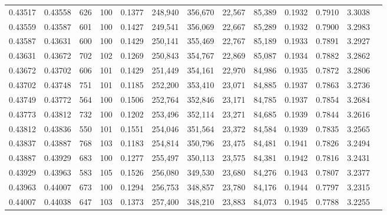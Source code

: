 \begin{tabular}{rrrrrrrrrrrrr}
0.43517 & 0.43558 &   626 & 100 &                                     0.1377 & 248,940 & 356,670 &  22,567 &  85,389 & 0.1932 & 0.7910 & 3.3038 \\
0.43559 & 0.43587 &   601 & 100 &                                     0.1427 & 249,541 & 356,069 &  22,667 &  85,289 & 0.1932 & 0.7900 & 3.2983 \\
0.43587 & 0.43631 &   600 & 100 &                                     0.1429 & 250,141 & 355,469 &  22,767 &  85,189 & 0.1933 & 0.7891 & 3.2927 \\
0.43631 & 0.43672 &   702 & 102 &                                     0.1269 & 250,843 & 354,767 &  22,869 &  85,087 & 0.1934 & 0.7882 & 3.2862 \\
0.43672 & 0.43702 &   606 & 101 &                                     0.1429 & 251,449 & 354,161 &  22,970 &  84,986 & 0.1935 & 0.7872 & 3.2806 \\
0.43702 & 0.43748 &   751 & 101 &                                     0.1185 & 252,200 & 353,410 &  23,071 &  84,885 & 0.1937 & 0.7863 & 3.2736 \\
0.43749 & 0.43772 &   564 & 100 &                                     0.1506 & 252,764 & 352,846 &  23,171 &  84,785 & 0.1937 & 0.7854 & 3.2684 \\
0.43773 & 0.43812 &   732 & 100 &                                     0.1202 & 253,496 & 352,114 &  23,271 &  84,685 & 0.1939 & 0.7844 & 3.2616 \\
0.43812 & 0.43836 &   550 & 101 &                                     0.1551 & 254,046 & 351,564 &  23,372 &  84,584 & 0.1939 & 0.7835 & 3.2565 \\
0.43837 & 0.43887 &   768 & 103 &                                     0.1183 & 254,814 & 350,796 &  23,475 &  84,481 & 0.1941 & 0.7826 & 3.2494 \\
0.43887 & 0.43929 &   683 & 100 &                                     0.1277 & 255,497 & 350,113 &  23,575 &  84,381 & 0.1942 & 0.7816 & 3.2431 \\
0.43929 & 0.43963 &   583 & 105 &                                     0.1526 & 256,080 & 349,530 &  23,680 &  84,276 & 0.1943 & 0.7807 & 3.2377 \\
0.43963 & 0.44007 &   673 & 100 &                                     0.1294 & 256,753 & 348,857 &  23,780 &  84,176 & 0.1944 & 0.7797 & 3.2315 \\
0.44007 & 0.44038 &   647 & 103 &                                     0.1373 & 257,400 & 348,210 &  23,883 &  84,073 & 0.1945 & 0.7788 & 3.2255 \\

\end{tabular}
